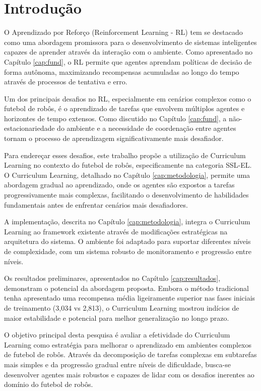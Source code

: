 
\chapter{Introdução}
\label{cap:intro}

O Aprendizado por Reforço (Reinforcement Learning - RL) tem se destacado como uma abordagem promissora para o desenvolvimento de sistemas inteligentes capazes de aprender através da interação com o ambiente. Como apresentado no Capítulo \ref{cap:fund}, o RL permite que agentes aprendam políticas de decisão de forma autônoma, maximizando recompensas acumuladas ao longo do tempo através de processos de tentativa e erro.

Um dos principais desafios no RL, especialmente em cenários complexos como o futebol de robôs, é o aprendizado de tarefas que envolvem múltiplos agentes e horizontes de tempo extensos. Como discutido no Capítulo \ref{cap:fund}, a não-estacionariedade do ambiente e a necessidade de coordenação entre agentes tornam o processo de aprendizagem significativamente mais desafiador.

Para endereçar esses desafios, este trabalho propõe a utilização de Curriculum Learning no contexto do futebol de robôs, especificamente na categoria SSL-EL. O Curriculum Learning, detalhado no Capítulo \ref{cap:metodologia}, permite uma abordagem gradual ao aprendizado, onde os agentes são expostos a tarefas progressivamente mais complexas, facilitando o desenvolvimento de habilidades fundamentais antes de enfrentar cenários mais desafiadores.

A implementação, descrita no Capítulo \ref{cap:metodologia}, integra o Curriculum Learning ao framework existente através de modificações estratégicas na arquitetura do sistema. O ambiente foi adaptado para suportar diferentes níveis de complexidade, com um sistema robusto de monitoramento e progressão entre níveis.

Os resultados preliminares, apresentados no Capítulo \ref{cap:resultados}, demonstram o potencial da abordagem proposta. Embora o método tradicional tenha apresentado uma recompensa média ligeiramente superior nas fases iniciais de treinamento (3,034 vs 2,813), o Curriculum Learning mostrou indícios de maior estabilidade e potencial para melhor generalização no longo prazo.

O objetivo principal desta pesquisa é avaliar a efetividade do Curriculum Learning como estratégia para melhorar o aprendizado em ambientes complexos de futebol de robôs. Através da decomposição de tarefas complexas em subtarefas mais simples e da progressão gradual entre níveis de dificuldade, busca-se desenvolver agentes mais robustos e capazes de lidar com os desafios inerentes ao domínio do futebol de robôs.

